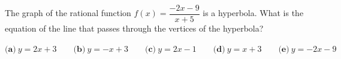 The graph of the rational function $f(x)=\dfrac{-2x-9}{x+5}$ is a hyperbola. What is the equation of the line that passes through the vertices of the hyperbola?

$\textbf{(a)}\ y=2x+3\qquad\textbf{(b)}\ y=-x+3\qquad\textbf{(c)}\ y=2x-1\qquad\textbf{(d)}\ y=x+3\qquad\textbf{(e)}\ y=-2x-9$
